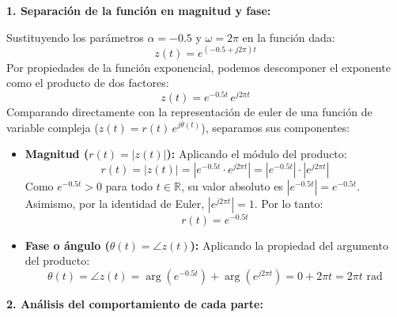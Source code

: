 \documentclass[11pt,a4paper]{article}
\begin{document}
\noindent\textbf{1. Separación de la función en magnitud y fase:}

Sustituyendo los parámetros $\alpha = -0.5$ y $\omega = 2\pi$ en la función dada:
\[
z(t) = e^{(-0.5 + j2\pi)t}
\]
Por propiedades de la función exponencial, podemos descomponer el exponente como el producto de dos factores:
\[
z(t) = e^{-0.5t} \, e^{j2\pi t}
\]
Comparando directamente con la representación de euler de una función de variable compleja ($z(t) = r(t) \, e^{j\theta(t)}$), separamos sus componentes:
\begin{itemize}
    \item \textbf{Magnitud ($r(t) = |z(t)|$):}
    Aplicando el módulo del producto:
    \[
    r(t) = |z(t)| = |e^{-0.5t} \cdot e^{j2\pi t}| = |e^{-0.5t}| \cdot |e^{j2\pi t}|
    \]
    Como $e^{-0.5t} > 0$ para todo $t \in \mathbb{R}$, su valor absoluto es $|e^{-0.5t}| = e^{-0.5t}$. Asimismo, por la identidad de Euler, $|e^{j2\pi t}| = 1$. Por lo tanto:
    \[
    r(t) = e^{-0.5t}
    \]

    \item \textbf{Fase o ángulo ($\theta(t) = \angle z(t)$):}
    Aplicando la propiedad del argumento del producto:
    \[
    \theta(t) = \angle z(t) = \arg(e^{-0.5t}) + \arg(e^{j2\pi t}) = 0 + 2\pi t = 2\pi t \text{ rad}
    \]
\end{itemize}

\noindent\textbf{2. Análisis del comportamiento de cada parte:}
\end{document}
